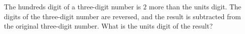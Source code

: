 The hundreds digit of a three-digit number is $2$ more than the units digit. The digits of the three-digit number are reversed, and the result is subtracted from the original three-digit number. What is the units digit of the result?

